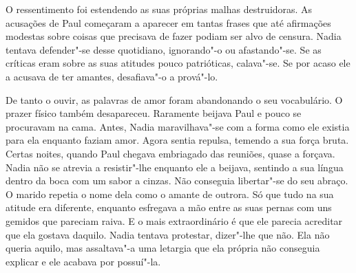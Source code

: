 O ressentimento foi estendendo as suas próprias malhas destruidoras. As
acusações de Paul começaram a aparecer em tantas frases que até
afirmações modestas sobre coisas que precisava de fazer podiam ser alvo
de censura. Nadia tentava defender"-se desse quotidiano, ignorando"-o ou
afastando"-se. Se as críticas eram sobre as suas atitudes pouco
patrióticas, calava"-se. Se por acaso ele a acusava de ter amantes,
desafiava"-o a prová"-lo.

De tanto o ouvir, as palavras de amor foram abandonando o seu
vocabulário. O prazer físico também desapareceu. Raramente beijava
Paul e pouco se procuravam na cama. Antes, Nadia maravilhava"-se com a
forma como ele existia para ela enquanto faziam amor. Agora sentia
repulsa, temendo a sua força bruta. Certas noites, quando Paul chegava
embriagado das reuniões, quase a forçava. Nadia não se atrevia a
resistir"-lhe enquanto ele a beijava, sentindo a sua língua dentro da
boca com um sabor a cinzas. Não conseguia libertar"-se do seu abraço. O marido repetia o nome
dela como o amante de outrora. Só que tudo na sua atitude era diferente,
enquanto esfregava a mão entre as suas pernas com uns gemidos que
pareciam raiva. E o mais extraordinário é que ele parecia acreditar que
ela gostava daquilo. Nadia tentava protestar, dizer"-lhe que não. Ela não
queria aquilo, mas assaltava"-a uma letargia que ela própria não
conseguia explicar e ele acabava por possuí"-la.

